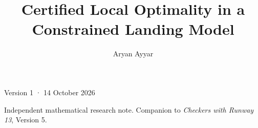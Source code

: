 \documentclass[12pt,nosurname]{RFS}
\begin{document}
\title{Certified Local Optimality in a Constrained Landing Model}
\author{Aryan Ayyar}

\maketitle
{\footnotesize\noindent Version 1 · 14 October 2026\par}
\medskip
{\small\noindent Independent mathematical research note. Companion to \emph{Checkers with Runway 13}, Version 5.\par}
\clearpage

\FloatBarrier
\FloatBarrier

\FloatBarrier
\FloatBarrier
\FloatBarrier

\clearpage\appendix

\clearpage\setlength{\bibsep}{3pt}
\end{document}
